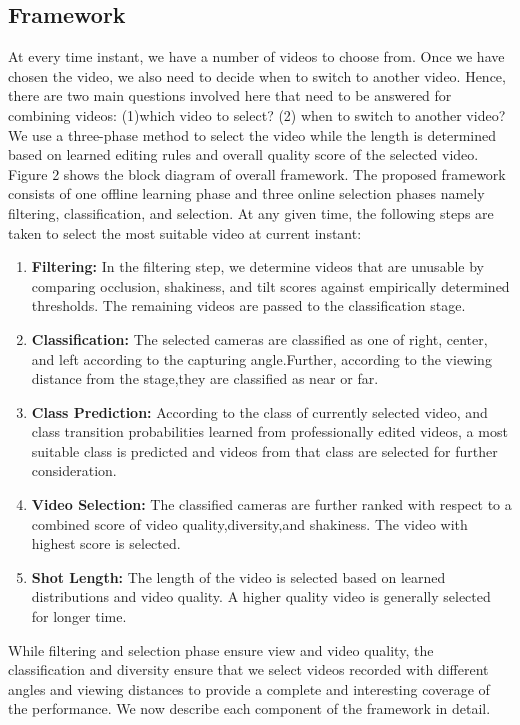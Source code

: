 \documentclass{sig-alternate}
\begin{document}
\subsection{Framework}
At every time instant, we have a number of videos to choose from. Once we have chosen the video, we also need to decide when to switch to another video. Hence, there are two main questions involved here that need to be answered for combining videos: (1)which video to select? (2) when to switch to another video? We use a three-phase method to select the video while the length is determined based on learned editing rules and overall quality score of the selected video.\\
Figure 2 shows the block diagram of overall framework. The proposed framework consists of one offline learning phase and three online selection phases namely filtering, classification, and selection. At any given time, the following steps are taken to select the most suitable video at current instant:
\begin{enumerate}
\item \textbf{Filtering:} In the filtering step, we determine videos that are unusable by comparing occlusion, shakiness, and tilt scores against empirically determined thresholds. The remaining videos are passed to the classification stage.
\item \textbf{Classification:} The selected cameras are classified as one of right, center, and left according to the capturing angle.Further, according to the viewing distance from the stage,they are classified as near or far.
\item \textbf{Class Prediction:} According to the class of currently selected video, and class transition probabilities learned from professionally edited videos, a most suitable class is predicted and videos from that class are selected for further consideration.
\item \textbf{Video Selection:} The classified cameras are further ranked with respect to a combined score of video quality,diversity,and shakiness. The video with highest score is selected.
\item \textbf{Shot Length:} The length of the video is selected based on learned distributions and video quality. A higher quality video is generally selected for longer time.
\end{enumerate}

While filtering and selection phase ensure view and video quality, the classification and diversity ensure that we select videos
recorded with different angles and viewing distances to provide a complete and interesting coverage of the performance. We now describe each component of the framework in detail.
\end{document}

